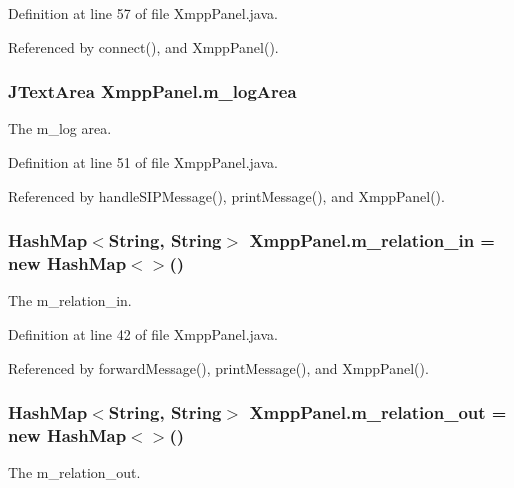 Definition at line 57 of file Xmpp\-Panel.\-java.



Referenced by connect(), and Xmpp\-Panel().

\hypertarget{class_xmpp_panel_ae531db25a81474f201775bfbf1ad5451}{
\subsubsection[{m\-\_\-log\-Area}]{\setlength{\rightskip}{0pt plus 5cm}J\-Text\-Area Xmpp\-Panel.\-m\-\_\-log\-Area\hspace{0.3cm}{\ttfamily [private]}}}\label{class_xmpp_panel_ae531db25a81474f201775bfbf1ad5451}
The m\-\_\-log area. 

Definition at line 51 of file Xmpp\-Panel.\-java.



Referenced by handle\-S\-I\-P\-Message(), print\-Message(), and Xmpp\-Panel().

\hypertarget{class_xmpp_panel_aa982fa1d5105a0ac752e14fae8321eb8}{
\subsubsection[{m\-\_\-relation\-\_\-in}]{\setlength{\rightskip}{0pt plus 5cm}Hash\-Map$<$String, String$>$ Xmpp\-Panel.\-m\-\_\-relation\-\_\-in = new Hash\-Map$<$$>$()\hspace{0.3cm}{\ttfamily [private]}}}\label{class_xmpp_panel_aa982fa1d5105a0ac752e14fae8321eb8}
The m\-\_\-relation\-\_\-in. 

Definition at line 42 of file Xmpp\-Panel.\-java.



Referenced by forward\-Message(), print\-Message(), and Xmpp\-Panel().

\hypertarget{class_xmpp_panel_af8300e818e7ba4948c1a682c89860706}{
\subsubsection[{m\-\_\-relation\-\_\-out}]{\setlength{\rightskip}{0pt plus 5cm}Hash\-Map$<$String, String$>$ Xmpp\-Panel.\-m\-\_\-relation\-\_\-out = new Hash\-Map$<$$>$()\hspace{0.3cm}{\ttfamily [private]}}}\label{class_xmpp_panel_af8300e818e7ba4948c1a682c89860706}
The m\-\_\-relation\-\_\-out. 

